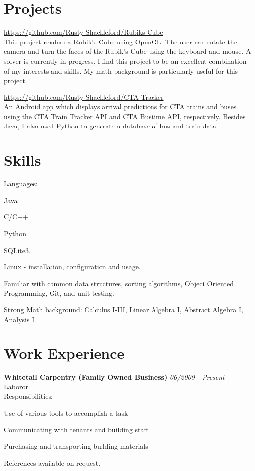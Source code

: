 \documentclass[letterpaper]{article}
\begin{document}
\section*{Projects}
\begin{compactitem}
    \item \url{https://github.com/Rusty-Shackleford/Rubiks-Cube} \\
    This project renders a Rubik's Cube using OpenGL. The user can rotate the 
    camera and turn the faces of the Rubik's Cube using the keyboard and mouse. 
    A solver is currently in progress. I find this project to be an excellent 
    combination of my interests and skills. My math background is particularly 
    useful for this project.
    \vspace{1ex}

    \item \url{https://github.com/Rusty-Shackleford/CTA-Tracker} \\
    An Android app which displays arrival predictions for CTA trains and buses 
    using the CTA Train Tracker API and CTA Bustime API, respectively. Besides 
    Java, I also used Python to generate a database of bus and train data.
\end{compactitem}


\section*{Skills}
Languages:
\vspace{-1ex}
\begin{compactitem}
    \item Java
    \item C/C++ 
    \item Python
    \item SQLite3.
\end{compactitem}

Linux - installation, configuration and usage.

Familiar with common data structures, sorting algorithms, Object Oriented Programming, Git, and unit testing.

Strong Math background: Calculus I-III, Linear Algebra I, Abstract Algebra I, 
Analysis I  

\section*{Work Experience}
\textbf{Whitetail Carpentry (Family Owned Business)} \hfill \emph{06/2009 - Present} \\
Laboror \\
Responsibilities:
\vspace{-1ex}
\begin{compactitem}
    \item Use of various tools to accomplish a task
    \item Communicating with tenants and building staff
    \item Purchasing and transporting building materials
\end{compactitem}

References available on request. 
\end{document}
